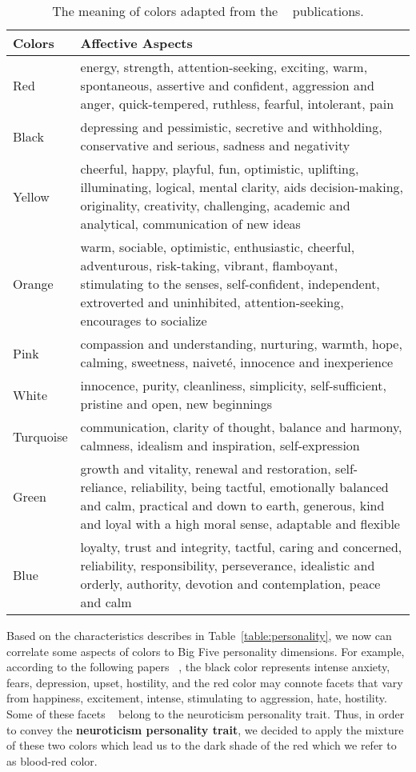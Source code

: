 \begin{table} [h]
\centering
\begin{tabular}{ | m{8em} | m{25em}| } 
\hline
\textbf{Colors} & \textbf{Affective Aspects}  \\
\hline
Red & energy, strength, attention-seeking, exciting, warm, spontaneous, assertive and confident,
aggression and anger, quick-tempered, ruthless, fearful, intolerant, pain  \\
\hline 
Black & depressing and pessimistic, secretive and withholding, conservative and serious,
sadness and negativity  \\
\hline 
Yellow & cheerful, happy, playful, fun, optimistic, uplifting, illuminating, logical, mental clarity,
aids decision-making, originality, creativity, challenging, academic and analytical, communication of new ideas   \\
\hline 
Orange & warm, sociable, optimistic, enthusiastic, cheerful, adventurous, risk-taking, vibrant,
flamboyant, stimulating to the senses,  self-confident, independent, extroverted and uninhibited,
attention-seeking, encourages to socialize  \\
\hline 
Pink & compassion and understanding, nurturing, warmth, hope, calming, sweetness,
naiveté, innocence and inexperience  \\
\hline
White & innocence, purity, cleanliness, simplicity, self-sufficient, pristine and open, new beginnings  \\
\hline
Turquoise &  communication, clarity of thought, balance and harmony, calmness,
idealism and inspiration, self-expression \\
\hline
Green & growth and vitality, renewal and restoration, self-reliance, reliability,
being tactful, emotionally balanced and calm, practical and down to earth, generous, kind and loyal
with a high moral sense, adaptable and flexible  \\
\hline
Blue &  loyalty, trust and integrity, tactful, caring and concerned, reliability, responsibility,
perseverance, idealistic and orderly, authority, devotion and contemplation, peace and calm \\
\hline
\end{tabular}
\caption{The meaning of colors adapted from the ~\cite{luscher1971luscher,cerrato2012meaning, alschuler1943easel,schaie1961scaling} publications.}
\label{table:color}
\end{table}

Based on the characteristics describes in Table~\ref{table:personality},
we now can correlate some aspects of colors to Big Five personality dimensions.
For example, according to the following papers ~\cite{alschuler1943easel,schaie1961scaling},
the black color represents intense anxiety, fears, depression, upset, hostility, and the red color may
connote facets that vary from happiness, excitement, intense, stimulating to aggression, hate, hostility.
Some of these facets ~\cite{costa1988catalog} belong to the neuroticism personality trait.
Thus, in order to convey the \textbf{neuroticism personality trait}, we decided to apply the
mixture of these two colors which lead us to the dark shade of the red which we refer to as blood-red color.

